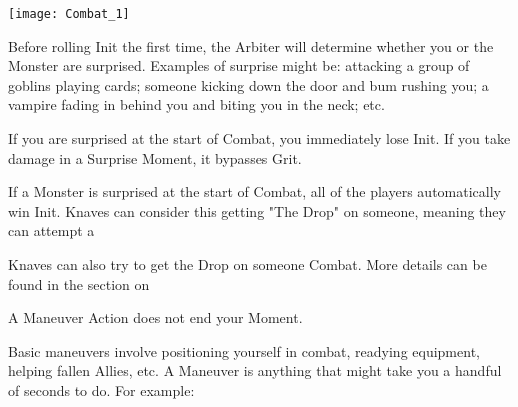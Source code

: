 {  

     \begin{center}
  \texttt{[image: Combat\_1]}
  \end{center}


  Before rolling Init the first time, the Arbiter will determine whether you or the Monster are surprised. Examples of surprise might be: attacking a group of goblins playing cards; someone kicking down the door and bum rushing you; a vampire fading in behind you and biting you in the neck; etc.

  If you are surprised at the start of Combat, you immediately lose Init. If you take damage in a Surprise Moment, it bypasses Grit.

  If a Monster is surprised at the start of Combat, all of the players automatically win Init.  Knaves can consider this getting "The Drop" on someone, meaning they can attempt a 

  Knaves can also try to get the Drop on someone  Combat.  More details can be found in the section on 


  A Maneuver Action does not end your Moment.


  Basic maneuvers involve positioning yourself in combat, readying equipment, helping fallen Allies, etc.  A Maneuver is anything that might take you a handful of seconds to do.  For example:

}
